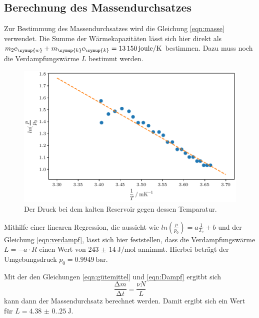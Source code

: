  \subsection{Berechnung des Massendurchsatzes}

Zur Bestimmung des Massendurchsatzes wird die Gleichung \ref{eqn:masse} verwendet. Die Summe der Wärmekapazitäten lässt sich hier 
direkt als $m_2c_{\symup{w}}+m_{\symup{k}}c_{\symup{k}}=\qty{13150}{joule\per\kelvin}$ bestimmen. Dazu muss noch die Verdampfungswärme
$L$ bestimmt werden.

\begin{figure}
    \centering
    \includegraphics{verdampfplot.pdf}
    \caption{Der Druck bei dem kalten Reservoir gegen dessen Temparatur.}
    \label{fig:druckkalt}
\end{figure}

Mithilfe einer linearen Regression, die aussieht wie $ln(\frac{p}{p_0})=a\frac{1}{T_2}+b$ und der Gleichung \ref{eqn:verdampf},
lässt sich hier feststellen, dass die Verdampfungswärme $L=-a \cdot R$ einen Wert von $\qty{243(14)}{\joule\per\mole}$ annimmt.
Hierbei beträgt der Umgebungsdruck $p_0=\qty{0.9949}{\bar}$. \cite{pdortmund}

Mit der den Gleichungen \ref{eqn:gütemittel} und \ref{eqn:Dampf} ergitbt sich 
\begin{equation*}
  \frac{\increment m}{\increment t}=\frac{\nu N}{L}
\end{equation*}
kann dann der Massendurchsatz berechnet werden.
Damit ergibt sich ein Wert für $L=\qty{4.38(0.25)}{\joule}$.



